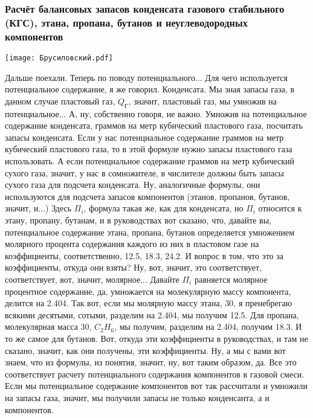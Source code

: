 \documentclass[main.tex]{subfiles}
\begin{document}
\subsubsection{Расчёт балансовых запасов конденсата газового стабильного (КГС), этана, пропана, бутанов и неуглеводородных компонентов}

\begin{center}
\texttt{[image: Брусиловский.pdf]}
\end{center}

Дальше поехали.
Теперь по поводу потенциального...
Для чего используется потенциальное содержание, я же говорил.
Конденсата.
Мы зная запасы газа, в данном случае пластовый газ, $Q_{\text{Г}}$, значит, пластовый газ, мы умножив на потенциальное...
А, ну, собственно говоря, не важно.
Умножив на потенциальное содержание конденсата, граммов на метр кубический пластового газа, посчитать запасы конденсата.
Если у нас потенциальное содержание граммов на метр кубический пластового газа, то в этой формуле нужно запасы пластового газа использовать.
А если потенциальное содержание граммов на метр кубический сухого газа, значит, у нас в сомножителе, в числителе должны быть запасы сухого газа для подсчета конденсата.
Ну, аналогичные формулы, они используются для подсчета запасов компонентов (этанов, пропанов, бутанов, значит, и...)
Здесь $\Pi_i$, формула такая же, как для конденсата, но $\Pi_i$ относится к этану, пропану, бутанам, и в руководствах вот сказано, что, давайте вы, потенциальное содержание этана, пропана, бутанов определяется умножением молярного процента содержания каждого из них в пластовом газе на коэффициенты, соответственно, 12.5, 18.3, 24.2.
И вопрос в том, что это за коэффициенты, откуда они взяты?
Ну, вот, значит, это соответствует, соответствует, вот, значит, молярное...
Давайте $\Pi_i$ равняется молярное процентное содержание, да, умножается на молекулярную массу компонента, делится на 2.404.
Так вот, если мы молярную массу этана, 30, я пренебрегаю всякими десятыми, сотыми, разделим на 2.404, мы получим 12.5.
Для пропана, молекулярная масса 30, $C_2H_6$, мы получим, разделим на 2.404, получим 18.3.
И то же самое для бутанов.
Вот, откуда эти коэффициенты в руководствах, и там не сказано, значит, как они получены, эти коэффициенты.
Ну, а мы с вами вот знаем, что из формулы, из понятия, значит, ну, вот таким образом, да.
Все это соответствует расчету потенциального содержания компонентов в газовой смеси.
Если мы потенциальное содержание компонентов вот так рассчитали и умножили на запасы газа, значит, мы получили запасы не только конденсанта, а и компонентов.
\end{document}
